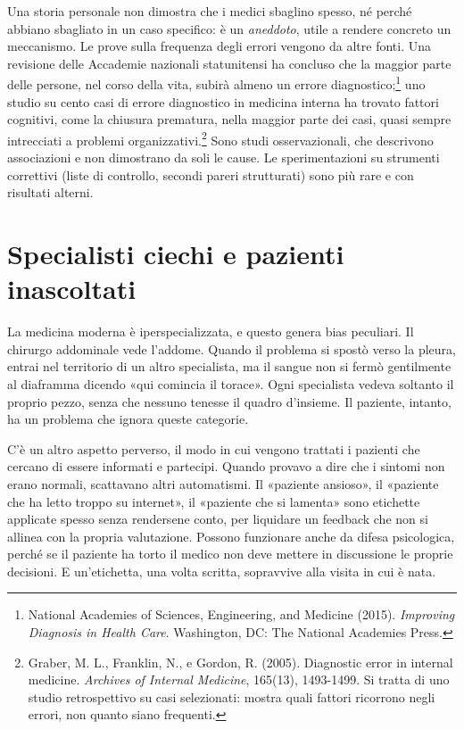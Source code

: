 \begin{concetto}
Una storia personale non dimostra che i medici sbaglino spesso, né perché abbiano sbagliato in un caso specifico: è un \textit{aneddoto}, utile a rendere concreto un meccanismo. Le prove sulla frequenza degli errori vengono da altre fonti. Una revisione delle Accademie nazionali statunitensi ha concluso che la maggior parte delle persone, nel corso della vita, subirà almeno un errore diagnostico;\footnote{National Academies of Sciences, Engineering, and Medicine (2015). \textit{Improving Diagnosis in Health Care}. Washington, DC: The National Academies Press.} uno studio su cento casi di errore diagnostico in medicina interna ha trovato fattori cognitivi, come la chiusura prematura, nella maggior parte dei casi, quasi sempre intrecciati a problemi organizzativi.\footnote{Graber, M. L., Franklin, N., e Gordon, R. (2005). Diagnostic error in internal medicine. \textit{Archives of Internal Medicine}, 165(13), 1493-1499. Si tratta di uno studio retrospettivo su casi selezionati: mostra quali fattori ricorrono negli errori, non quanto siano frequenti.} Sono studi osservazionali, che descrivono associazioni e non dimostrano da soli le cause. Le sperimentazioni su strumenti correttivi (liste di controllo, secondi pareri strutturati) sono più rare e con risultati alterni.
\end{concetto}

\section{Specialisti ciechi e pazienti inascoltati}

La medicina moderna \`{e} iperspecializzata, e questo genera bias peculiari. Il chirurgo addominale vede l'addome. Quando il problema si spost\`{o} verso la pleura, entrai nel territorio di un altro specialista, ma il sangue non si ferm\`{o} gentilmente al diaframma dicendo «qui comincia il torace». Ogni specialista vedeva soltanto il proprio pezzo, senza che nessuno tenesse il quadro d'insieme. Il paziente, intanto, ha un problema che ignora queste categorie.

C'\`{e} un altro aspetto perverso, il modo in cui vengono trattati i pazienti che cercano di essere informati e partecipi. Quando provavo a dire che i sintomi non erano normali, scattavano altri automatismi. Il «paziente ansioso», il «paziente che ha letto troppo su internet», il «paziente che si lamenta» sono etichette applicate spesso senza rendersene conto, per liquidare un feedback che non si allinea con la propria valutazione. Possono funzionare anche da difesa psicologica, perch\'{e} se il paziente ha torto il medico non deve mettere in discussione le proprie decisioni. E un'etichetta, una volta scritta, sopravvive alla visita in cui \`{e} nata.

